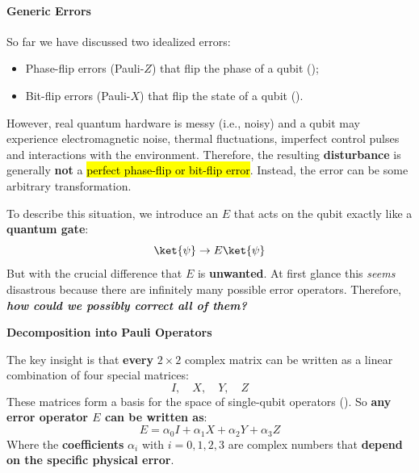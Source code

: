 \paragraph{Generic Errors}\label{sec:generic-errors}

So far we have discussed two idealized errors:
\begin{itemize}
    \item Phase-flip errors (Pauli-$Z$) that flip the phase of a qubit ();
    \item Bit-flip errors (Pauli-$X$) that flip the state of a qubit ().
\end{itemize}
However, real quantum hardware is messy (i.e., noisy) and a qubit may experience electromagnetic noise, thermal fluctuations, imperfect control pulses and interactions with the environment. Therefore, the resulting \textbf{disturbance} is generally \textbf{not} a \hl{perfect phase-flip or bit-flip error}. Instead, the error can be some arbitrary transformation.

\highspace
To describe this situation, we introduce an  $E$ that acts on the qubit exactly like a \textbf{quantum gate}:
\begin{equation}
    \ket{\psi} \rightarrow E \ket{\psi}
\end{equation}
But with the crucial difference that $E$ is \textbf{unwanted}. At first glance this \emph{seems} disastrous because there are infinitely many possible error operators. Therefore, \emph{\textbf{how could we possibly correct all of them?}}

\highspace
\begin{flushleft}
    \textcolor{Green3}{ \textbf{Decomposition into Pauli Operators}}
\end{flushleft}
The key insight is that \textbf{every} $2 \times 2$ complex matrix can be written as a linear combination of four special matrices:
\begin{equation*}
    I, \quad X, \quad Y, \quad Z
\end{equation*}
These matrices form a basis for the space of single-qubit operators (). So \textbf{any error operator $E$ can be written as}:
\begin{equation*}
    E = \alpha_0 I + \alpha_1 X + \alpha_2 Y + \alpha_3 Z
\end{equation*}
Where the \textbf{coefficients} $\alpha_i$ with $i = 0, 1, 2, 3$ are complex numbers that \textbf{depend on the specific physical error}.

